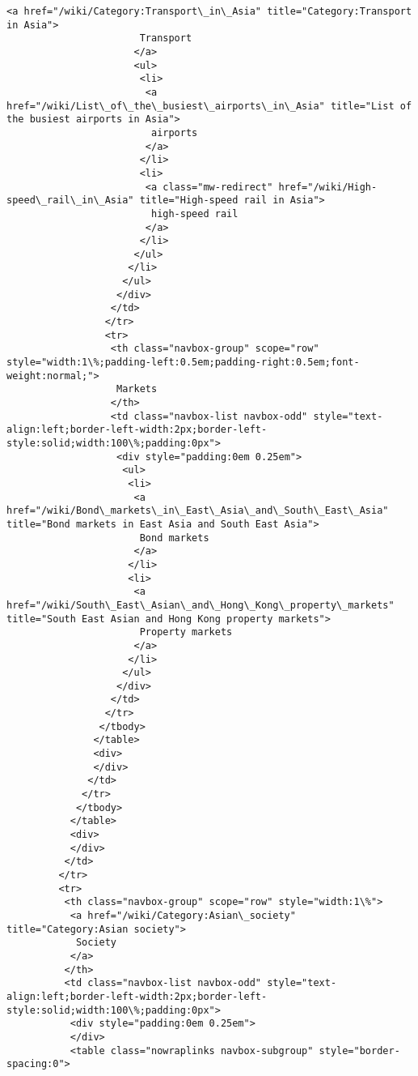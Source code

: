 \documentclass[11pt]{article}
\begin{document}
\begin{Verbatim}[commandchars=\\\{\}]
                      <a href="/wiki/Category:Transport\_in\_Asia" title="Category:Transport in Asia">
                       Transport
                      </a>
                      <ul>
                       <li>
                        <a href="/wiki/List\_of\_the\_busiest\_airports\_in\_Asia" title="List of the busiest airports in Asia">
                         airports
                        </a>
                       </li>
                       <li>
                        <a class="mw-redirect" href="/wiki/High-speed\_rail\_in\_Asia" title="High-speed rail in Asia">
                         high-speed rail
                        </a>
                       </li>
                      </ul>
                     </li>
                    </ul>
                   </div>
                  </td>
                 </tr>
                 <tr>
                  <th class="navbox-group" scope="row" style="width:1\%;padding-left:0.5em;padding-right:0.5em;font-weight:normal;">
                   Markets
                  </th>
                  <td class="navbox-list navbox-odd" style="text-align:left;border-left-width:2px;border-left-style:solid;width:100\%;padding:0px">
                   <div style="padding:0em 0.25em">
                    <ul>
                     <li>
                      <a href="/wiki/Bond\_markets\_in\_East\_Asia\_and\_South\_East\_Asia" title="Bond markets in East Asia and South East Asia">
                       Bond markets
                      </a>
                     </li>
                     <li>
                      <a href="/wiki/South\_East\_Asian\_and\_Hong\_Kong\_property\_markets" title="South East Asian and Hong Kong property markets">
                       Property markets
                      </a>
                     </li>
                    </ul>
                   </div>
                  </td>
                 </tr>
                </tbody>
               </table>
               <div>
               </div>
              </td>
             </tr>
            </tbody>
           </table>
           <div>
           </div>
          </td>
         </tr>
         <tr>
          <th class="navbox-group" scope="row" style="width:1\%">
           <a href="/wiki/Category:Asian\_society" title="Category:Asian society">
            Society
           </a>
          </th>
          <td class="navbox-list navbox-odd" style="text-align:left;border-left-width:2px;border-left-style:solid;width:100\%;padding:0px">
           <div style="padding:0em 0.25em">
           </div>
           <table class="nowraplinks navbox-subgroup" style="border-spacing:0">

\end{Verbatim}
\end{document}
